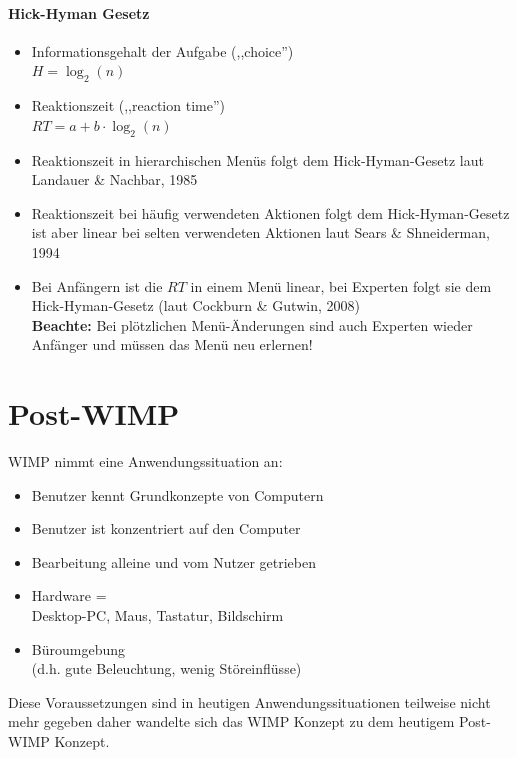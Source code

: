 \documentclass
[
	8pt,		%
	ngerman,	%
	a4paper,	%
	landscape,	%
	final		%
]{extarticle}
\begin{document}
\begin{multicols*}{4}
	\paragraph{Hick-Hyman Gesetz}
	\begin{itemize}
		\item Informationsgehalt der Aufgabe (,,choice'')\\
		      \(H = \log_{2}(n)\)
		\item Reaktionszeit (,,reaction time'')\\
		      \(RT = a + b \cdot \log_{2}(n)\)
		\item Reaktionszeit in hierarchischen Menüs folgt dem Hick-Hyman-Gesetz
		      laut Landauer \& Nachbar, 1985
		\item Reaktionszeit bei häufig verwendeten Aktionen folgt dem
		      Hick-Hyman-Gesetz ist aber linear bei selten verwendeten Aktionen
		      laut Sears \& Shneiderman, 1994
		\item Bei Anfängern ist die \(RT\) in einem Menü linear, bei Experten
		      folgt sie dem Hick-Hyman-Gesetz (laut Cockburn \& Gutwin, 2008) \\
		      \textbf{Beachte:} Bei plötzlichen Menü-Änderungen sind auch
		      Experten wieder Anfänger und müssen das Menü neu erlernen!
	\end{itemize}
	\section{Post-WIMP}
	WIMP nimmt eine Anwendungssituation an:
	\begin{itemize}
		\item Benutzer kennt Grundkonzepte von Computern
		\item Benutzer ist konzentriert auf den Computer
		\item Bearbeitung alleine und vom Nutzer getrieben
		\item Hardware = \\ Desktop-PC, Maus, Tastatur, Bildschirm
		\item Büroumgebung \\ (d.h. gute Beleuchtung, wenig Störeinflüsse)
	\end{itemize}
	Diese Voraussetzungen sind in heutigen Anwendungssituationen teilweise nicht
	mehr gegeben daher wandelte sich das WIMP Konzept zu dem heutigem Post-WIMP
	Konzept.

\end{multicols*}
\end{document}
